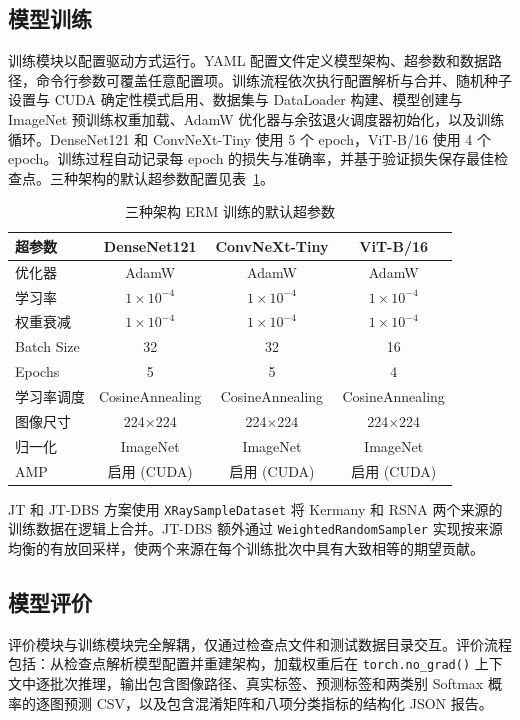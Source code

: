 \documentclass[12pt,a4paper,UTF8,openany]{ctexbook}
\begin{document}
\subsection{模型训练}

训练模块以配置驱动方式运行。YAML 配置文件定义模型架构、超参数和数据路径，命令行参数可覆盖任意配置项。训练流程依次执行配置解析与合并、随机种子设置与 CUDA 确定性模式启用、数据集与 DataLoader 构建、模型创建与 ImageNet 预训练权重加载、AdamW 优化器与余弦退火调度器初始化，以及训练循环。DenseNet121 和 ConvNeXt-Tiny 使用 5 个 epoch，ViT-B/16 使用 4 个 epoch。训练过程自动记录每 epoch 的损失与准确率，并基于验证损失保存最佳检查点。三种架构的默认超参数配置见表~\ref{tab:training_hyperparams}。

\begin{table}[htbp]
\centering
\caption{三种架构 ERM 训练的默认超参数}
\label{tab:training_hyperparams}
\renewcommand{\arraystretch}{1.3}
\begin{tabular}{lccc}
\toprule
\textbf{超参数} & \textbf{DenseNet121} & \textbf{ConvNeXt-Tiny} & \textbf{ViT-B/16} \\
\midrule
优化器 & AdamW & AdamW & AdamW \\
学习率 & $1\times10^{-4}$ & $1\times10^{-4}$ & $1\times10^{-4}$ \\
权重衰减 & $1\times10^{-4}$ & $1\times10^{-4}$ & $1\times10^{-4}$ \\
Batch Size & 32 & 32 & 16 \\
Epochs & 5 & 5 & 4 \\
学习率调度 & CosineAnnealing & CosineAnnealing & CosineAnnealing \\
图像尺寸 & 224×224 & 224×224 & 224×224 \\
归一化 & ImageNet & ImageNet & ImageNet \\
AMP & 启用 (CUDA) & 启用 (CUDA) & 启用 (CUDA) \\
\bottomrule
\end{tabular}
\end{table}

JT 和 JT-DBS 方案使用 \texttt{XRaySampleDataset} 将 Kermany 和 RSNA 两个来源的训练数据在逻辑上合并。JT-DBS 额外通过 \texttt{WeightedRandomSampler} 实现按来源均衡的有放回采样，使两个来源在每个训练批次中具有大致相等的期望贡献。

\subsection{模型评价}

评价模块与训练模块完全解耦，仅通过检查点文件和测试数据目录交互。评价流程包括：从检查点解析模型配置并重建架构，加载权重后在 \texttt{torch.no\_grad()} 上下文中逐批次推理，输出包含图像路径、真实标签、预测标签和两类别 Softmax 概率的逐图预测 CSV，以及包含混淆矩阵和八项分类指标的结构化 JSON 报告。
\end{document}
